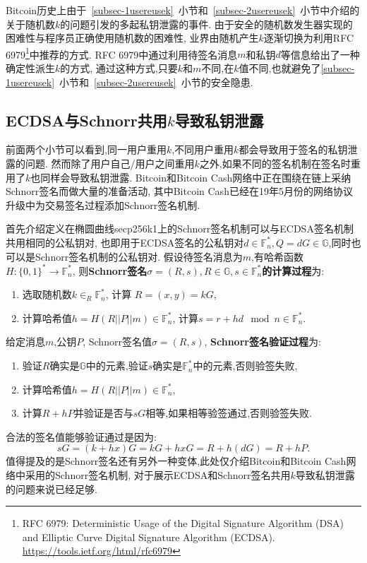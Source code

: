 \documentclass{article}
\renewcommand{\G}{\mathbb{G}}
\newcommand{\F}{\mathbb{F}}
\begin{document}
Bitcoin历史上由于~\ref{subsec-1usereusek}~小节和~\ref{subsec-2usereusek}~小节中介绍的
关于随机数$k$的问题引发的多起私钥泄露的事件. 
由于安全的随机数发生器实现的困难性与程序员正确使用随机数的困难性,
业界由随机产生$k$逐渐切换为利用RFC 6979\footnote{
RFC 6979: Deterministic Usage of the Digital Signature Algorithm (DSA) and Elliptic Curve Digital Signature Algorithm (ECDSA).
\url{https://tools.ietf.org/html/rfc6979}}中推荐的方式.
RFC 6979中通过利用待签名消息$m$和私钥$d$等信息给出了一种确定性派生$k$的方式,
通过这种方式,只要$k$和$m$不同,在$k$值不同,也就避免了\ref{subsec-1usereusek}~小节和~\ref{subsec-2usereusek}~小节的安全隐患.

\subsection{ECDSA与Schnorr共用$k$导致私钥泄露\label{subsec-ecdsaschnorr}}

前面两个小节可以看到,同一用户重用$k$,不同用户重用$k$都会导致用于签名的私钥泄露的问题.
然而除了用户自己/用户之间重用$k$之外,如果不同的签名机制在签名时重用了$k$也同样会导致私钥泄露.
Bitcoin和Bitcoin Cash网络中正在围绕在链上采纳Schnorr签名而做大量的准备活动,
其中Bitcoin Cash已经在19年5月份的网络协议升级中为交易签名过程添加Schnorr签名机制.

首先介绍定义在椭圆曲线secp256k1上的Schnorr签名机制可以与ECDSA签名机制共用相同的公私钥对,
也即用于ECDSA签名的公私钥对$d\in\F_n^*, Q=dG\in\G$,同时也可以是Schnorr签名机制的公私钥对.
假设待签名消息为$m$,有哈希函数$H: \{0,1\}^*\rightarrow \F_n^*$, 
则\textbf{Schnorr签名$\sigma=(R,s), R\in \G, s\in\F_n^*$的计算过程}为:
\begin{enumerate}
\item 选取随机数$k\in_R\F_n^*$, 计算 $R=(x,y)=kG$,
\item 计算哈希值$h = H(R||P||m)\in\F_n^*$, 计算$s=r+hd \mod n \in \F_n^*$.
\end{enumerate}
给定消息$m$,公钥$P$, Schnorr签名值$\sigma=(R,s)$, \textbf{Schnorr签名验证过程}为:
\begin{enumerate}
\item 验证$R$确实是$\G$中的元素,验证$s$确实是$\F_n^*$中的元素,否则验签失败,
\item 计算哈希值$h = H(R||P||m)\in\F_n^*$,
\item 计算$R+hP$并验证是否与$sG$相等,如果相等验签通过,否则验签失败.
\end{enumerate}
合法的签名值能够验证通过是因为:
$$
sG = (k+hx)G = kG + hxG = R + h(dG) = R + hP.
$$
值得提及的是Schnorr签名还有另外一种变体,此处仅介绍Bitcoin和Bitcoin Cash网络中采用的Schnorr签名机制,
对于展示ECDSA和Schnorr签名共用$k$导致私钥泄露的问题来说已经足够.
\end{document}
